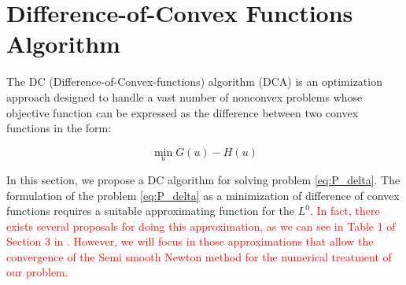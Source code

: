 \documentclass[11pt,a4paper]{amsart}
\begin{document}
\section{Difference-of-Convex Functions Algorithm}

The DC (Difference-of-Convex-functions) algorithm (DCA) is an optimization approach designed to handle a vast number of nonconvex problems whose objective function can be expressed as the difference between two convex functions in the form: 

\begin{equation}\min_u G(u) - H(u) \label{eq:dc}\end{equation}

In this section, we propose a DC algorithm for solving problem \eqref{eq:P_delta}. The formulation of the problem \eqref{eq:P_delta} as a minimization of difference of convex functions requires a suitable approximating function for the $L^0$. \textcolor{red}{In fact, there exists several proposals for doing this approximation, as we can see in Table 1 of Section 3 in \cite{dcsparsel0}. However, we will focus in those approximations that allow the convergence of the Semi smooth Newton method for the numerical treatment of our problem.}

\end{document}
